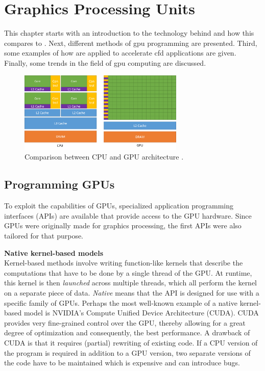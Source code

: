 \chapter{Graphics Processing Units} \label{chap:gpgpu}
This chapter starts with an introduction to the technology behind  and how this compares to . Next, different methods of \acrshort{gpu} programming are presented. Third, some examples of how  are applied to accelerate \acrshort{cfd} applications are given. Finally, some trends in the field of \acrshort{gpu} computing are discussed.

\begin{figure}[H]
    \centering
    \includegraphics[width=0.7\textwidth]{../images/cpu-vs-gpu-diagram.png}
    \caption{Comparison between CPU and GPU architecture \citep{nvidiaCUDAProgrammingGuide2023}.}
    \label{fig:cpu-vs-gpu-diagram}
\end{figure}

\section{Programming GPUs} \label{sec:programming_gpus}
To exploit the capabilities of GPUs, specialized application programming interfaces (APIs) are available that provide access to the GPU hardware. Since GPUs were originally made for graphics processing, the first APIs were also tailored for that purpose. 

\textbf{Native kernel-based models} \\
Kernel-based methods involve writing function-like kernels that describe the computations that have to be done by a single thread of the GPU. At runtime, this kernel is then \emph{launched} across multiple threads, which all perform the kernel on a separate piece of data. \emph{Native} means that the API is designed for use with a specific family of GPUs. Perhaps the most well-known example of a native kernel-based model is NVIDIA's Compute Unified Device Architecture (CUDA). CUDA provides very fine-grained control over the GPU, thereby allowing for a great degree of optimization and consequently, the best performance. A drawback of CUDA is that it requires (partial) rewriting of existing code. If a CPU version of the program is required in addition to a GPU version, two separate versions of the code have to be maintained which is expensive and can introduce bugs. 

